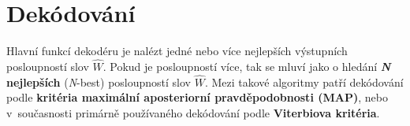 \section{Dekódování}
\label{chap:asr:decoding}

Hlavní funkcí dekodéru je nalézt jedné nebo více nejlepších výstupních posloupností slov $\hat{W}$.
Pokud je posloupností více, tak se mluví jako o hledání \textbf{\textit{N} nejlepších} (\textit{N}-best) posloupností slov $\hat{W}$.
Mezi takové algoritmy patří dekódování podle \textbf{kritéria maximální aposteriorní pravděpodobnosti (MAP)}, nebo v~současnosti primárně používaného dekódování podle \textbf{Viterbiova kritéria}.



